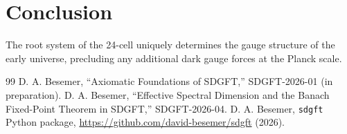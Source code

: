 \documentclass[amsmath,amssymb,aps,prd,twocolumn,superscriptaddress,nofootinbib]{revtex4-2}
\begin{document}
\section{Conclusion}
The root system of the 24-cell uniquely determines the gauge structure of the early universe, precluding any additional dark gauge forces at the Planck scale.



\begin{thebibliography}{99}
 D. A. Besemer, ``Axiomatic Foundations of SDGFT,'' SDGFT-2026-01 (in preparation).
 D. A. Besemer, ``Effective Spectral Dimension and the Banach Fixed-Point Theorem in SDGFT,'' SDGFT-2026-04.
 D. A. Besemer, \texttt{sdgft} Python package, \url{https://github.com/david-besemer/sdgft} (2026).
\end{thebibliography}
\end{document}
